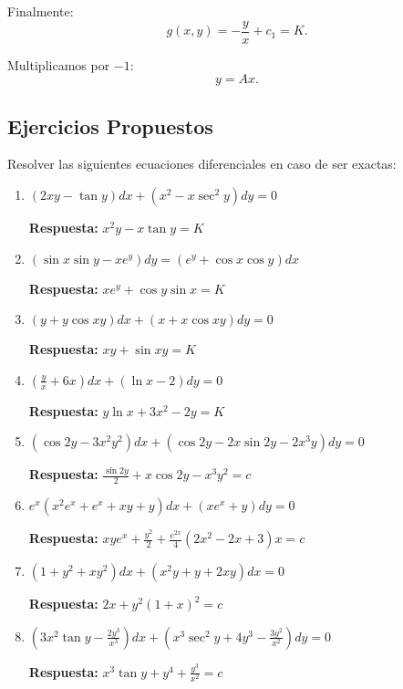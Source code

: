 \noindent Finalmente:
\[
g( x,y) = -\frac{y}{x} + c_{1} = K.
\]

\noindent Multiplicamos por \( -1 \):
\[
y = Ax.
\]

\subsection{Ejercicios Propuestos}

Resolver las siguientes ecuaciones diferenciales en caso de ser exactas:

\begin{enumerate}
    \item \( (2xy - \tan y)dx + (x^2 - x\sec^2 y)dy = 0 \)
    
    \textbf{Respuesta:} \( x^2 y - x \tan y = K \)

    \item \( (\sin x \sin y - x e^y)dy = (e^y + \cos x \cos y)dx \)
    
    \textbf{Respuesta:} \( x e^y + \cos y \sin x = K \)

    \item \( (y + y \cos xy) dx + (x + x \cos xy) dy = 0 \)
    
    \textbf{Respuesta:} \( xy + \sin xy = K \)

    \item \( \left(\frac{y}{x} + 6x\right) dx + (\ln x -2) dy = 0 \)
    
    \textbf{Respuesta:} \( y \ln x + 3x^2 - 2y = K \)

    \item \( (\cos 2y - 3x^2 y^2)dx + (\cos 2y - 2x \sin 2y - 2x^3 y)dy = 0 \)
    
    \textbf{Respuesta:} \( \frac{\sin 2y}{2} + x \cos 2y - x^3 y^2 = c \)

    \item \( e^x (x^2 e^x + e^x + xy + y)dx + (x e^x + y)dy = 0 \)
    
    \textbf{Respuesta:} \( x y e^x + \frac{y^2}{2} + \frac{e^{2x}}{4} (2x^2 - 2x + 3)x = c \)

    \item \( (1 + y^2 + xy^2)dx + (x^2 y + y + 2xy)dx = 0 \)
    
    \textbf{Respuesta:} \( 2x + y^2 (1 + x)^2 = c \)

    \item \( (3x^2 \tan y - \frac{2y^3}{x^3})dx + (x^3 \sec^2 y + 4y^3 - \frac{3y^2}{x^2})dy = 0 \)
    
    \textbf{Respuesta:} \( x^3 \tan y + y^4 + \frac{y^3}{x^2} = c \)


\end{enumerate}
